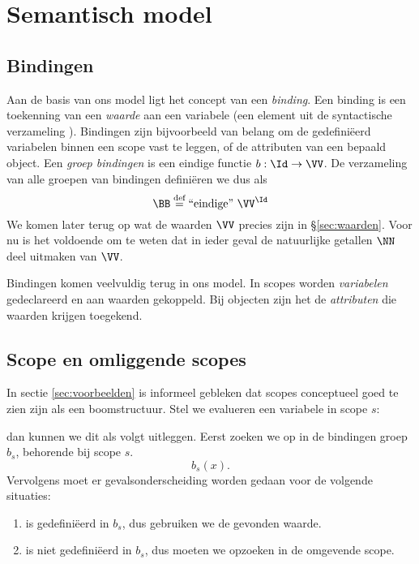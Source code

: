 \chapter{Semantisch model}

\section{Bindingen}\label{sec:bindingen}

Aan de basis van ons model ligt het concept van een \emph{binding}. Een binding is een toekenning van een \emph{waarde} aan een variabele (een element uit de syntactische verzameling \Id). Bindingen zijn bijvoorbeeld van belang om de gedefiniëerd variabelen binnen een scope vast te leggen, of de attributen van een bepaald object. Een \emph{groep bindingen} is een eindige functie $b : \Id \to \VV$. De verzameling van alle groepen van bindingen definiëren we dus als
\begin{equation*}
  \BB \DEF \FiniteFunctions{\VV}{\Id}
\end{equation*}
We komen later terug op wat de waarden $\VV$ precies zijn in §\ref{sec:waarden}. Voor nu is het voldoende om te weten dat in ieder geval de natuurlijke getallen $\NN$ deel uitmaken van $\VV$.

Bindingen komen veelvuldig terug in ons model. In scopes worden \emph{variabelen} gedeclareerd en aan waarden gekoppeld. Bij objecten zijn het de \emph{attributen} die waarden krijgen toegekend.

\section{Scope en omliggende scopes}

In sectie \ref{sec:voorbeelden} is informeel gebleken dat scopes conceptueel goed te zien zijn als een boomstructuur. Stel we evalueren een variabele  in scope $s$:

\newCodeFragment
{}

dan kunnen we dit als volgt uitleggen. Eerst zoeken we  op in de bindingen groep $b_s$, behorende bij scope $s$.
%
\begin{equation*}
  b_s(x).
\end{equation*}
%
Vervolgens moet er gevalsonderscheiding worden gedaan voor de volgende situaties:

\begin{enumerate}
  \item {} is gedefiniëerd in $b_s$, dus gebruiken we de gevonden waarde.
  \item {} is niet gedefiniëerd in $b_s$, dus moeten we  opzoeken in de omgevende scope.
\end{enumerate}

